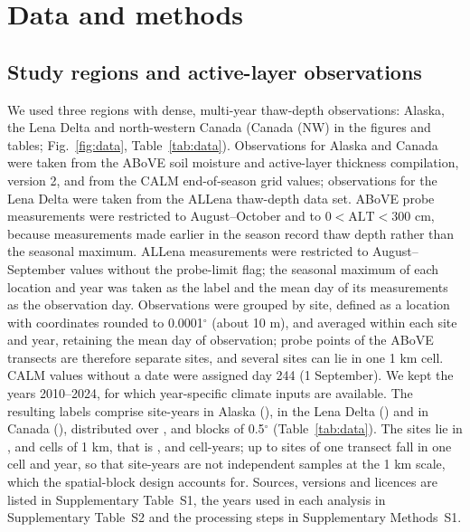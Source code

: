 \section{Data and methods}\label{sec:methods}

\subsection{Study regions and active-layer observations}
We used three regions with dense, multi-year thaw-depth observations: Alaska, the Lena Delta and north-western Canada (Canada (NW) in the figures and tables; Fig.~\ref{fig:data}, Table~\ref{tab:data}). Observations for Alaska and Canada were taken from the ABoVE soil moisture and active-layer thickness compilation, version 2\cite{Moore2025}, and from the CALM end-of-season grid values\cite{Streletskiy2025}; observations for the Lena Delta were taken from the ALLena thaw-depth data set\cite{Veremeeva2025}. ABoVE probe measurements were restricted to August--October and to $0<\mathrm{ALT}<300$ cm, because measurements made earlier in the season record thaw depth rather than the seasonal maximum. ALLena measurements were restricted to August--September values without the probe-limit flag; the seasonal maximum of each location and year was taken as the label and the mean day of its measurements as the observation day. Observations were grouped by site, defined as a location with coordinates rounded to 0.0001$^\circ$ (about 10 m), and averaged within each site and year, retaining the mean day of observation; probe points of the ABoVE transects are therefore separate sites, and several sites can lie in one 1 km cell. CALM values without a date were assigned day 244 (1 September). We kept the years 2010--2024, for which year-specific climate inputs are available. The resulting labels comprise \nncyAk{} site-years in Alaska (\nyrsAk), \nncyLe{} in the Lena Delta (\nyrsLe) and \nncyCa{} in Canada (\nyrsCa), distributed over \nnblkAk, \nnblkLe{} and \nnblkCa{} blocks of 0.5$^\circ$ (Table~\ref{tab:data}). The sites lie in \nnkmcellAk, \nnkmcellLe{} and \nnkmcellCa{} cells of 1 km, that is \nnkmcyAk, \nnkmcyLe{} and \nnkmcyCa{} cell-years; up to \nnkmmaxAk{} sites of one transect fall in one cell and year, so that site-years are not independent samples at the 1 km scale, which the spatial-block design accounts for. Sources, versions and licences are listed in Supplementary Table~S1, the years used in each analysis in Supplementary Table~S2 and the processing steps in Supplementary Methods~S1.

